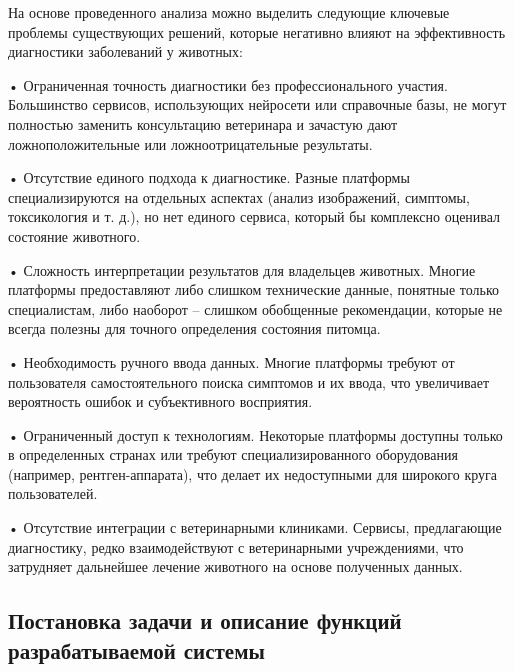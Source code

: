 {  
  \par \redline На основе проведенного анализа можно выделить следующие ключевые проблемы существующих решений, которые негативно влияют на эффективность диагностики заболеваний у животных:
  
  \par \redline • Ограниченная точность диагностики без профессионального участия. Большинство сервисов, использующих нейросети или справочные базы, не могут полностью заменить консультацию ветеринара и зачастую дают ложноположительные или ложноотрицательные результаты.
  \par \redline • Отсутствие единого подхода к диагностике. Разные платформы специализируются на отдельных аспектах (анализ изображений, симптомы, токсикология и т. д.), но нет единого сервиса, который бы комплексно оценивал состояние животного.
  \par \redline • Сложность интерпретации результатов для владельцев животных. Многие платформы предоставляют либо слишком технические данные, понятные только специалистам, либо наоборот – слишком обобщенные рекомендации, которые не всегда полезны для точного определения состояния питомца.
  \par \redline • Необходимость ручного ввода данных. Многие платформы требуют от пользователя самостоятельного поиска симптомов и их ввода, что увеличивает вероятность ошибок и субъективного восприятия.
  \par \redline • Ограниченный доступ к технологиям. Некоторые платформы доступны только в определенных странах или требуют специализированного оборудования (например, рентген-аппарата), что делает их недоступными для широкого круга пользователей.
  \par \redline • Отсутствие интеграции с ветеринарными клиниками. Сервисы, предлагающие диагностику, редко взаимодействуют с ветеринарными учреждениями, что затрудняет дальнейшее лечение животного на основе полученных данных.

  \par
}
\subtitlespace


\subsection*{
  \gostTitleFont
   Постановка задачи и описание функций разрабатываемой системы
}

\subtitlespace


